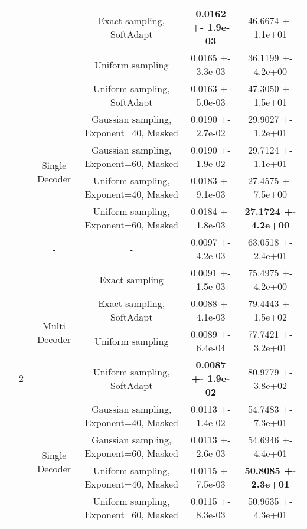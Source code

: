 \begin{tabular}{||c|c|c|c|c|c||}
 &  &  & Exact sampling, SoftAdapt & \textbf{0.0162 +- 1.9e-03} & 46.6674 +- 1.1e+01 \\
\cline{4-6}
 &  &  & Uniform sampling & 0.0165 +- 3.3e-03 & 36.1199 +- 4.2e+00 \\
\cline{4-6}
 &  &  & Uniform sampling, SoftAdapt & 0.0163 +- 5.0e-03 & 47.3050 +- 1.5e+01 \\
\cline{4-6}
\cline{3-6}
 &  & \multirow{4}{*}{Single Decoder} & Gaussian sampling, Exponent=40, Masked & 0.0190 +- 2.7e-02 & 29.9027 +- 1.2e+01 \\
\cline{4-6}
 &  &  & Gaussian sampling, Exponent=60, Masked & 0.0190 +- 1.9e-02 & 29.7124 +- 1.1e+01 \\
\cline{4-6}
 &  &  & Uniform sampling, Exponent=40, Masked & 0.0183 +- 9.1e-03 & 27.4575 +- 7.5e+00 \\
\cline{4-6}
 &  &  & Uniform sampling, Exponent=60, Masked & 0.0184 +- 1.8e-03 & \textbf{27.1724 +- 4.2e+00} \\
\cline{4-6}
\cline{3-6}
\cline{2-6}
 & \multirow{9}{*}{2} & \multirow{1}{*}{-} & - & 0.0097 +- 4.2e-03 & 63.0518 +- 2.4e+01 \\
\cline{4-6}
\cline{3-6}
 &  & \multirow{4}{*}{Multi Decoder} & Exact sampling & 0.0091 +- 1.5e-03 & 75.4975 +- 4.2e+00 \\
\cline{4-6}
 &  &  & Exact sampling, SoftAdapt & 0.0088 +- 4.1e-03 & 79.4443 +- 1.5e+02 \\
\cline{4-6}
 &  &  & Uniform sampling & 0.0089 +- 6.4e-04 & 77.7421 +- 3.2e+01 \\
\cline{4-6}
 &  &  & Uniform sampling, SoftAdapt & \textbf{0.0087 +- 1.9e-02} & 80.9779 +- 3.8e+02 \\
\cline{4-6}
\cline{3-6}
 &  & \multirow{4}{*}{Single Decoder} & Gaussian sampling, Exponent=40, Masked & 0.0113 +- 1.4e-02 & 54.7483 +- 7.3e+01 \\
\cline{4-6}
 &  &  & Gaussian sampling, Exponent=60, Masked & 0.0113 +- 2.6e-03 & 54.6946 +- 4.4e+01 \\
\cline{4-6}
 &  &  & Uniform sampling, Exponent=40, Masked & 0.0115 +- 7.5e-03 & \textbf{50.8085 +- 2.3e+01} \\
\cline{4-6}
 &  &  & Uniform sampling, Exponent=60, Masked & 0.0115 +- 8.3e-03 & 50.9635 +- 4.3e+01 \\
\cline{4-6}
\cline{3-6}
\cline{2-6}
\hline
\hline
\end{tabular}
